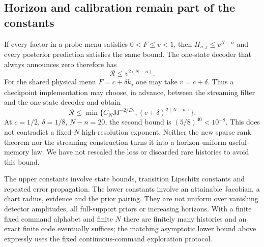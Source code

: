 \subsection{Horizon and calibration remain part of the constants}
If every factor in a probe menu satisfies $0<F\le v<1$, then
$H_{n,j}\le v^{N-n}$ and every posterior prediction satisfies the same
bound. The one-state decoder that always announces zero therefore has
\begin{equation}\label{eq:zero-memory}
 \mathcal R\le v^{2(N-n)}.
\end{equation}
For the shared physical menu $F=c+\delta k_j$ one may take $v=c+\delta$.
Thus a checkpoint implementation may choose, in advance, between the
streaming filter and the one-state decoder and obtain
\[
 \mathcal R\le\min\{C_N M^{-2/D_*},(c+\delta)^{2(N-n)}\}.
\]
At $c=1/2$, $\delta=1/8$, $N-n=20$, the second bound is
$(5/8)^{40}<10^{-8}$. This does not contradict a fixed-$N$ high-resolution
exponent. Neither the new sparse rank theorem nor the streaming construction
turns it into a horizon-uniform useful-memory law. We have not rescaled
the loss or discarded rare histories to avoid this bound.

The upper constants involve state bounds, transition Lipschitz constants
and repeated error propagation. The lower constants involve an attainable
Jacobian, a chart radius, evidence and the prior pairing. They are not
uniform over vanishing detector amplitudes, all full-support priors or
increasing horizons. With a finite fixed command alphabet and finite $N$
there are finitely many histories and an exact finite code eventually
suffices; the matching asymptotic lower bound above expressly uses the
fixed continuous-command exploration protocol.
